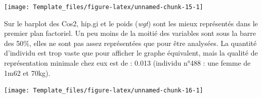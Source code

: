 \documentclass[
]{article}
\begin{document}
\begin{center}\texttt{[image: Template\_files/figure-latex/unnamed-chunk-15-1]} \end{center}

Sur le barplot des Cos2, hip.gi et le poids (\emph{wgt}) sont les mieux
représentés dans le premier plan factoriel. Un peu moins de la moitié
des variables sont sous la barre des 50\%, elles ne sont pas assez
représentées que pour être analysées. La quantité d'individu est trop
vaste que pour afficher le graphe équivalent, mais la qualité de
représentation minimale chez eux est de : 0.013 (individu n°488 : une
femme de 1m62 et 70kg).

\begin{center}\texttt{[image: Template\_files/figure-latex/unnamed-chunk-16-1]} \end{center}
\end{document}
